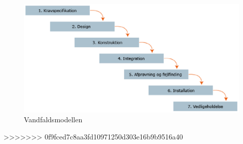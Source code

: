 \begin{center}
\begin{figure}
\includegraphics[trim = 0mm 100mm 100mm 500mm]{./vandfaldmodel.eps}
\caption{Vandfaldsmodellen}
\end{figure}
\end{center}

>>>>>>> 0f9fced7c8aa3fd10971250d303e16b9b9516a40
